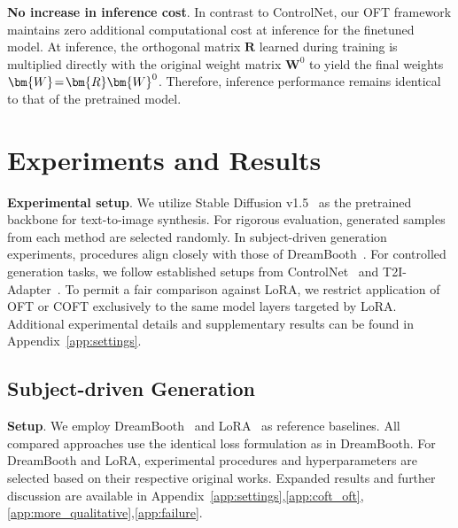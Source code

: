 \textbf{No increase in inference cost}. In contrast to ControlNet, our OFT framework maintains zero additional computational cost at inference for the finetuned model. At inference, the orthogonal matrix $\bm{R}$ learned during training is multiplied directly with the original weight matrix $\bm{W}^0$ to yield the final weights $\thickmuskip=2mu \medmuskip=2mu \bm{W}=\bm{R}\bm{W}^0$. Therefore, inference performance remains identical to that of the pretrained model.

\section{Experiments and Results}

\textbf{Experimental setup}. We utilize Stable Diffusion v1.5~\cite{rombach2022high} as the pretrained backbone for text-to-image synthesis. For rigorous evaluation, generated samples from each method are selected randomly. In subject-driven generation experiments, procedures align closely with those of DreamBooth~\cite{ruiz2023dreambooth}. For controlled generation tasks, we follow established setups from ControlNet~\cite{zhang2023adding} and T2I-Adapter~\cite{mou2023t2i}. To permit a fair comparison against LoRA, we restrict application of OFT or COFT exclusively to the same model layers targeted by LoRA. Additional experimental details and supplementary results can be found in Appendix~\ref{app:settings}.

\subsection{Subject-driven Generation}

\textbf{Setup}. We employ DreamBooth~\cite{ruiz2023dreambooth} and LoRA~\cite{hulora2022} as reference baselines. All compared approaches use the identical loss formulation as in DreamBooth. For DreamBooth and LoRA, experimental procedures and hyperparameters are selected based on their respective original works. Expanded results and further discussion are available in Appendix~\ref{app:settings},\ref{app:coft_oft},\ref{app:more_qualitative},\ref{app:failure}.

